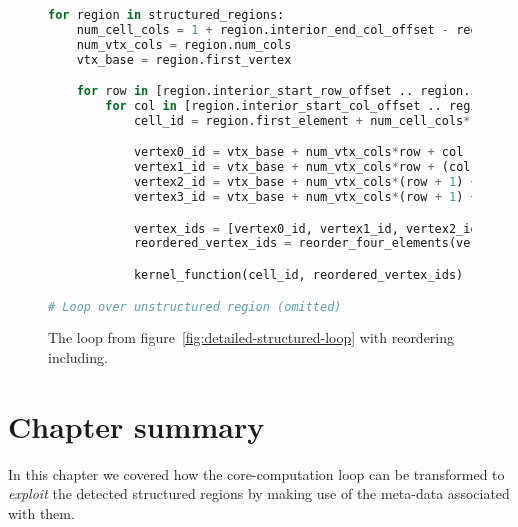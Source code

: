 \begin{figure}
\newsavebox{\structureloopc}
\begin{lrbox}{\structureloopc}
\begin{lstlisting}[language=python]
for region in structured_regions:
	num_cell_cols = 1 + region.interior_end_col_offset - region.interior_end_start_offset
	num_vtx_cols = region.num_cols
	vtx_base = region.first_vertex

	for row in [region.interior_start_row_offset .. region.interior_end_row_offset]:
		for col in [region.interior_start_col_offset .. region.interior_end_col_offset]:
			cell_id = region.first_element + num_cell_cols*row + col

			vertex0_id = vtx_base + num_vtx_cols*row + col
			vertex1_id = vtx_base + num_vtx_cols*row + (col + 1)
			vertex2_id = vtx_base + num_vtx_cols*(row + 1) + col
			vertex3_id = vtx_base + num_vtx_cols*(row + 1) + (col + 1)

			vertex_ids = [vertex0_id, vertex1_id, vertex2_id, vertex3_id]
			reordered_vertex_ids = reorder_four_elements(vertex_ids, region.compass)

			kernel_function(cell_id, reordered_vertex_ids)

# Loop over unstructured region (omitted)
\end{lstlisting}
\end{lrbox}

\usebox{\structureloopc}
\caption{The loop from figure~\ref{fig:detailed-structured-loop} with reordering including.}
\label{fig:final-structured-loop}
\end{figure}

\section{Chapter summary}
In this chapter we covered how the core-computation loop can be transformed to \emph{exploit} the detected structured regions by making use of the meta-data associated with them.